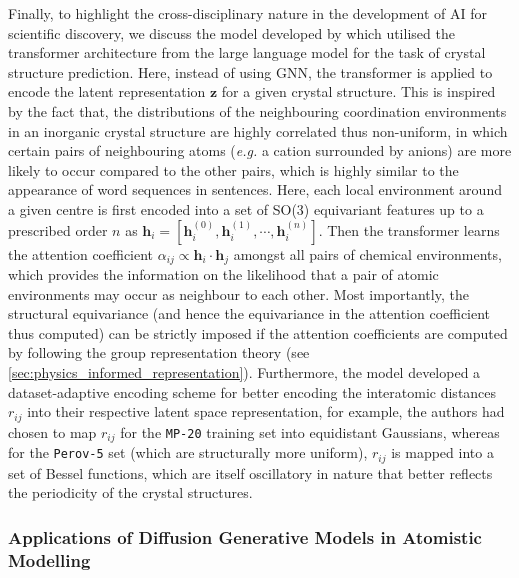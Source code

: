 Finally, to highlight the cross-disciplinary nature in the development of AI for scientific discovery, we discuss the model developed by \citet{chen2025transformer} which utilised the transformer architecture\cite{vaswani2017attention} from the large language model for the task of crystal structure prediction. Here, instead of using GNN, the transformer is applied to encode the latent representation $\bm{z}$ for a given crystal structure. This is inspired by the fact that, the distributions of the neighbouring coordination environments in an inorganic crystal structure are highly correlated thus non-uniform, in which certain pairs of neighbouring atoms (\emph{e.g.} a cation surrounded by anions) are more likely to occur compared to the other pairs, which is highly similar to the appearance of word sequences in sentences. Here, each local environment around a given centre is first encoded into a set of SO(3) equivariant features up to a prescribed order $n$ as $\bm{h}_i=[\bm{h}_i^{(0)},\bm{h}_i^{(1)},\cdots,\bm{h}_i^{(n)}]$. Then the transformer learns the attention coefficient $\alpha_{ij}\propto \bm{h}_i\cdot\bm{h}_j$ amongst all pairs of chemical environments, which provides the information on the likelihood that a pair of atomic environments may occur as neighbour to each other. Most importantly, the structural equivariance (and hence the equivariance in the attention coefficient thus computed) can be strictly imposed if the attention coefficients are computed by following the group representation theory (see \cref{sec:physics_informed_representation}). Furthermore, the model developed a dataset-adaptive encoding scheme for better encoding the interatomic distances $r_{ij}$  into their respective latent space representation, for example, the authors had chosen to map $r_{ij}$ for the \texttt{MP-20} training set into equidistant Gaussians, whereas for the \texttt{Perov-5} set (which are structurally more uniform), $r_{ij}$ is mapped into a set of Bessel functions, which are itself oscillatory in nature that better reflects the periodicity of the crystal structures. 

\subsubsection{Applications of Diffusion Generative Models in Atomistic Modelling}
\label{sec:generative_diffusion_examples}


